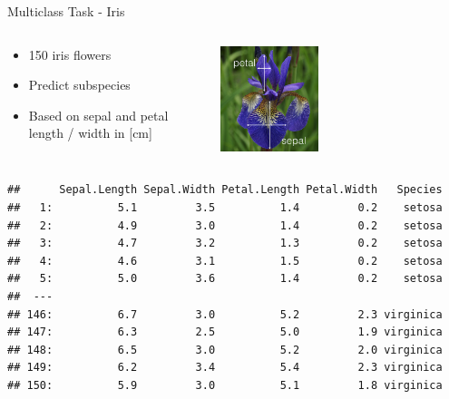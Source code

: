 \documentclass[11pt,compress,t,notes=noshow, xcolor=table]{beamer}
\begin{document}
\begin{vbframe}{Multiclass Task - Iris}

\begin{columns}[T]
\begin{column}{0.5\textwidth}
\begin{itemize}
\item 150 iris flowers
\item Predict subspecies
\item Based on sepal and petal length / width in [cm]
\end{itemize}
\end{column}
\begin{column}{0.5\textwidth}
\includegraphics[width=0.4\textwidth]{figure_man/iris_petal_sepal.png}
\end{column}
\end{columns}
\scriptsize
{}\color{fgcolor}\begin{kframe}
\begin{verbatim}
##      Sepal.Length Sepal.Width Petal.Length Petal.Width   Species
##   1:          5.1         3.5          1.4         0.2    setosa
##   2:          4.9         3.0          1.4         0.2    setosa
##   3:          4.7         3.2          1.3         0.2    setosa
##   4:          4.6         3.1          1.5         0.2    setosa
##   5:          5.0         3.6          1.4         0.2    setosa
##  ---
## 146:          6.7         3.0          5.2         2.3 virginica
## 147:          6.3         2.5          5.0         1.9 virginica
## 148:          6.5         3.0          5.2         2.0 virginica
## 149:          6.2         3.4          5.4         2.3 virginica
## 150:          5.9         3.0          5.1         1.8 virginica
\end{verbatim}
\end{kframe}

\end{vbframe}
\end{document}
